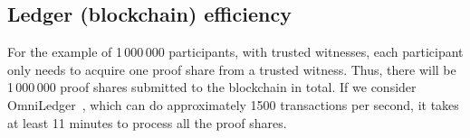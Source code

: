 \subsection{Ledger (blockchain) efficiency}

For the example of 1\,000\,000 participants, with trusted witnesses, each 
participant only needs to acquire one proof share from a trusted witness.
Thus, there will be 1\,000\,000 proof shares submitted to the blockchain in total.
If we consider OmniLedger~\cite{OmniLedger}, which can do approximately 1500 transactions per second, it takes at least 11 minutes to process all the proof shares.




